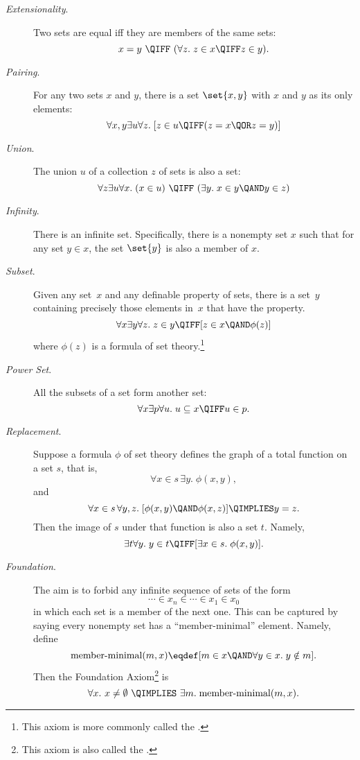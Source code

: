 \begin{description}

\item[\emph{Extensionality}.]  Two sets are equal iff
  they are members of the same sets:
\[
x = y\ \QIFF\ (\forall z.\; z \in x \QIFF z \in y).
\]

\item[\emph{Pairing}.] For
  any two sets $x$ and $y$, there is a set $\set{x,y}$ with $x$ and
  $y$ as its only elements:
\[
\forall x,y \exists u \forall z.\;
[z \in u \QIFF (z = x \QOR z = y)]
\]

\item[\emph{Union}.]  The union
  $u$ of a collection $z$ of sets is also a set:
\[
\forall z \exists u \forall x.\;
  (x \in u)\ \QIFF\ (\exists y.\; x \in y \QAND y \in z) 
\]

\item[\emph{Infinity}.]  There
  is an infinite set.  Specifically, there is a nonempty set $x$
  such that for any set $y \in x$, the set $\set{y}$ is also a member
  of $x$.

\item[\emph{Subset}.] Given any set~$x$ and any
  definable property of sets, there is a set~$y$ containing precisely
  those elements in~$x$ that have the property.
\[
\forall x \exists y \forall z.\; z \in y \QIFF [z \in x \QAND \phi(z)]
\]
where $\phi(z)$ is a formula of set theory.\footnote{This axiom is more commonly called
    the .}

\item[\emph{Power Set}.]  All the
  subsets of a set form another set:
\[
\forall x \exists p \forall u.\; u \subseteq x \QIFF u \in p.
\]

\item[\emph{Replacement}.]
  Suppose a formula $\phi$ of set theory defines the graph of a
  total function on a set $s$, that is,
\[
\forall x \in s\, \exists y.\; \phi(x,y),
\]
and
\[
\forall x \in s\, \forall y, z.\; [\phi(x,y) \QAND \phi(x,z)] \QIMPLIES y = z.
\]
Then the image of $s$ under that function is also a set $t$.  Namely,
\[
\exists t \forall y.\; y \in t \QIFF [\exists x\in s.\; \phi(x,y)].
\]

\item[\emph{Foundation}.]  The aim is to forbid any infinite
  sequence of sets of the form
\[
\cdots \in x_n \in \cdots \in x_1 \in x_0
\]
in which each set is a member of the next one.  This can be
captured by saying every nonempty set has a ``member-minimal''
element.  Namely, define
\[
\text{member-minimal}(m, x) \eqdef [m \in x \QAND \forall y \in x.\; y \notin m].
\]
Then the Foundation Axiom\footnote{This axiom is also called the
  .} is
\[
\forall x.\ x \neq \emptyset\ \QIMPLIES\ \exists m.\; \text{member-minimal}(m, x).
\]


\end{description}
